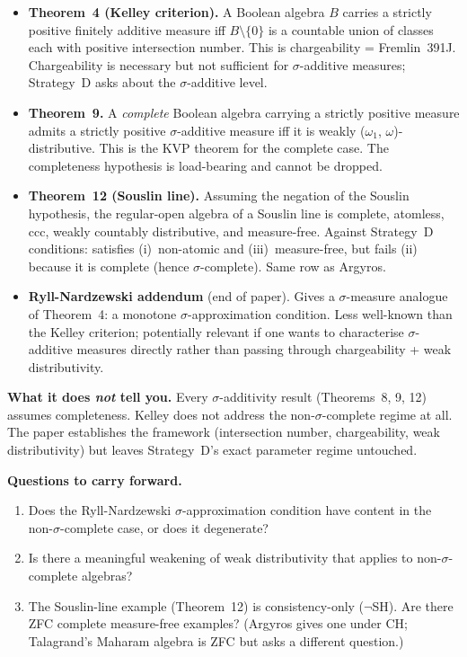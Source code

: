 \begin{itemize}[nosep]
  \item \textbf{Theorem~4 (Kelley criterion).}  A Boolean algebra
    $B$ carries a strictly positive finitely additive measure iff
    $B \setminus \{0\}$ is a countable union of classes each with
    positive intersection number.  This is chargeability =
    Fremlin~391J.  Chargeability is necessary but not sufficient
    for $\sigma$-additive measures; Strategy~D asks about the
    $\sigma$-additive level.

  \item \textbf{Theorem~9.}  A \emph{complete} Boolean algebra
    carrying a strictly positive measure admits a strictly positive
    $\sigma$-additive measure iff it is weakly ($\omega_1$,
    $\omega$)-distributive.  This is the KVP theorem for the
    complete case.  The completeness hypothesis is load-bearing
    and cannot be dropped.

  \item \textbf{Theorem~12 (Souslin line).}  Assuming the negation
    of the Souslin hypothesis, the regular-open algebra of a Souslin
    line is complete, atomless, ccc, weakly countably distributive,
    and measure-free.  Against Strategy~D conditions: satisfies
    (i)~non-atomic and (iii)~measure-free, but fails (ii) because
    it is complete (hence $\sigma$-complete).  Same row as Argyros.

  \item \textbf{Ryll-Nardzewski addendum} (end of paper).  Gives a
    $\sigma$-measure analogue of Theorem~4: a monotone
    $\sigma$-approximation condition.  Less well-known than the
    Kelley criterion; potentially relevant if one wants to
    characterise $\sigma$-additive measures directly rather than
    passing through chargeability + weak distributivity.
\end{itemize}

\medskip\noindent
\textbf{What it does \emph{not} tell you.}  Every $\sigma$-additivity
result (Theorems~8, 9, 12) assumes completeness.  Kelley does not
address the non-$\sigma$-complete regime at all.  The paper
establishes the framework (intersection number, chargeability,
weak distributivity) but leaves Strategy~D's exact parameter regime
untouched.

\medskip\noindent
\textbf{Questions to carry forward.}
\begin{enumerate}[nosep]
  \item Does the Ryll-Nardzewski $\sigma$-approximation condition
    have content in the non-$\sigma$-complete case, or does it
    degenerate?
  \item Is there a meaningful weakening of weak distributivity that
    applies to non-$\sigma$-complete algebras?
  \item The Souslin-line example (Theorem~12) is consistency-only
    ($\neg$SH).  Are there ZFC complete measure-free examples?
    (Argyros gives one under CH; Talagrand's Maharam algebra is
    ZFC but asks a different question.)
\end{enumerate}

